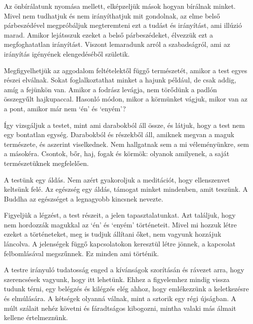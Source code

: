 Az önbírálatunk nyomása mellett, elképzeljük mások hogyan bírálnak
minket. Mivel nem tudhatjuk és nem irányíthatjuk mit gondolnak, az elme
belső párbeszédével megpróbáljuk megteremteni ezt a tudást és
irányítást, ami illúzió marad. Amikor lejátsszuk ezeket a belső
párbeszédeket, élvezzük ezt a megfoghatatlan irányítást. Viszont
lemaradunk arról a szabadságról, ami az irányítás igényének
elengedéséből születik.


Megfigyelhetjük az aggodalom feltételektől függő természetét, amikor a
test egyes részei elválnak. Sokat foglalkoztathat minket a hajunk
például, de csak addig, amíg a fejünkön van. Amikor a fodrász levágja,
nem törődünk a padlón összegyűlt hajkupaccal. Hasonló módon, mikor a
körmünket vágjuk, mikor van az a pont, amikor már nem `én' és `enyém'?

Így vizsgáljuk a testet, mint ami darabokból áll össze, és látjuk, hogy
a test nem egy bontatlan egység. Darabokból és részekből áll, amiknek
megvan a maguk természete, és aszerint viselkednek. Nem hallgatnak sem a
mi véleményünkre, sem a másokéra. Csontok, bőr, haj, fogak és körmök:
olyanok amilyenek, a saját természetüknek megfelelően.

\clearpage

A testünk egy áldás. Nem azért gyakoroljuk a meditációt, hogy
ellenszenvet keltsünk felé. Az egészség egy áldás, támogat minket
mindenben, amit teszünk. A Buddha az egészséget a legnagyobb kincsnek
nevezte.


Figyeljük a légzést, a test részeit, a jelen tapasztalatunkat. Azt
találjuk, hogy nem hordozzák magukkal az `én' és `enyém' történeteit.
Mivel mi hozzuk létre ezeket a történeteket, meg is tudjuk állítani
őket, nem vagyunk hozzájuk láncolva. A jelenségek függő kapcsolatokon
keresztül létre jönnek, a kapcsolat felbomlásával megszűnnek. Ez minden
ami történik.

A testre irányuló tudatosság enged a kívánságok szorításán és rávezet
arra, hogy szerencsések vagyunk, hogy itt lehetünk. Ehhez a figyelemhez
mindig vissza tudunk térni, egy belégzés és kilégzés elég ahhoz, hogy
emlékezzünk a keletkezésre és elmúlására. A kétségek olyanná válnak,
mint a sztorik egy régi újságban. A múlt szálait nehéz követni és
fáradtságos kibogozni, mintha valaki más álmait kellene értelmeznünk.

